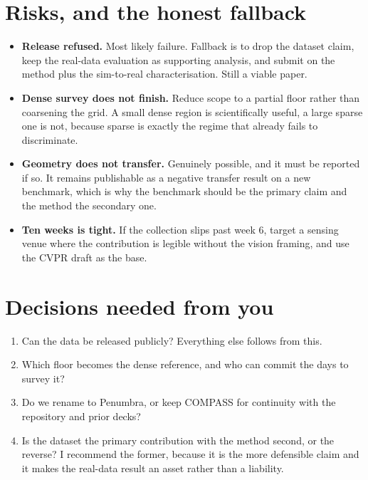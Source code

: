 \documentclass[11pt,a4paper]{article}
\begin{document}
\section{Risks, and the honest fallback}

\begin{itemize}
\item \textbf{Release refused.} Most likely failure. Fallback is to drop the dataset
claim, keep the real-data evaluation as supporting analysis, and submit on the method
plus the sim-to-real characterisation. Still a viable paper.
\item \textbf{Dense survey does not finish.} Reduce scope to a partial floor rather than
coarsening the grid. A small dense region is scientifically useful, a large sparse one is
not, because sparse is exactly the regime that already fails to discriminate.
\item \textbf{Geometry does not transfer.} Genuinely possible, and it must be reported if
so. It remains publishable as a negative transfer result on a new benchmark, which is
why the benchmark should be the primary claim and the method the secondary one.
\item \textbf{Ten weeks is tight.} If the collection slips past week 6, target a
sensing venue where the contribution is legible without the vision framing, and use the
CVPR draft as the base.
\end{itemize}

\section{Decisions needed from you}

\begin{enumerate}
\item Can the data be released publicly? Everything else follows from this.
\item Which floor becomes the dense reference, and who can commit the days to survey it?
\item Do we rename to Penumbra, or keep COMPASS for continuity with the repository and
prior decks?
\item Is the dataset the primary contribution with the method second, or the reverse? I
recommend the former, because it is the more defensible claim and it makes the real-data
result an asset rather than a liability.
\end{enumerate}
\end{document}
